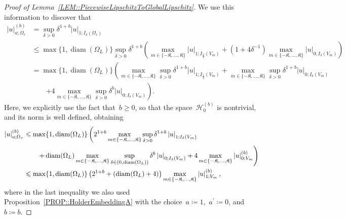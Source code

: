 \documentclass[12pt,a4paper]{amsart}
\makeatletter
\numberwithin{equation}{section}
\theoremstyle{definition}
\theoremstyle{remark}
\newcommand{\abs}[1]{\left\lvert#1\right\rvert}
\renewcommand{\leq}{\leqslant}
\renewcommand{\geq}{\geqslant}
\newcommand{\constapp}[1]{%
  \csname constapp@#1\endcsname%
}
\makeatother
\begin{document}
\begin{appendix}
\begin{proof}[Proof of Lemma~\ref{LEM::PiecewiseLipschitzToGlobalLipschitz}]
    We use this information to discover that
    \begin{equation}\label{EQ::LongComputationBis}
        \begin{split}
            \abs{u}_{a; \Omega_\tau}^{(b)} &= \sup_{\delta > 0}\delta^{1+b} \abs{u}_{1; I_\delta(\Omega_\tau)}\\
                &\leq \max\{1,\operatorname{diam}(\Omega_L)\} \sup_{\delta > 0}\delta^{1+b}\left(\max_{m \in \{-\mathfrak{K},\dots,\mathfrak{K}\}} \abs{u}_{1; I_{\frac{\delta}{2}}(V_m)} + (1+4{\delta^{-1}})\max_{m \in \{-\mathfrak{K},\dots,\mathfrak{K}\}}\abs{u}_{0;I_\delta(V_m)}\right)\\
                &= \max\{1,\operatorname{diam}(\Omega_L)\} \left(\max_{m \in \{-\mathfrak{K},\dots,\mathfrak{K}\}}\sup_{\delta > 0}\delta^{1+b}\abs{u}_{1; I_{\frac{\delta}{2}}(V_m)} +\max_{m \in \{-\mathfrak{K},\dots,\mathfrak{K}\}} \sup_{\delta > 0}\delta^{1+b}\abs{u}_{0;I_\delta(V_m)}\right.\\
                &\qquad \left.+ 4\max_{m \in \{-\mathfrak{K},\dots,\mathfrak{K}\}} \sup_{\delta > 0}\delta^{b}\abs{u}_{0;I_\delta(V_m)}\right).
        \end{split}
    \end{equation}
    Here, we explicitly use the fact that~$b \geq 0$, so that the space~$\mathcal{H}_0^{(b)}$ is nontrivial, and its norm is well defined, obtaining
    \begin{equation}\label{EQ::PiecewiseRegularityToGlobalLongComputationLipschitz}
        \begin{split}
                \abs{u}_{a; \Omega_\tau}^{(b)}&\leq \max\{1,\operatorname{diam}(\Omega_L)\} \left(2^{1+b}\max_{m \in \{-\mathfrak{K},\dots,\mathfrak{K}\}}\sup_{\delta > 0}\delta^{1+b}\abs{u}_{1; I_\delta(V_m)}\right.\\
                &\qquad \left.+ \operatorname{diam}(\Omega_L)\max_{m \in \{-\mathfrak{K},\dots,\mathfrak{K}\}} \sup_{\delta \in (0,\operatorname{diam}(\Omega_L))}\delta^{b}\abs{u}_{0;I_\delta(V_m)}+4\max_{m \in \{-\mathfrak{K},\dots,\mathfrak{K}\}} \abs{u}_{0;V_m}^{(b)}\right)\\
                &\leq \max\{1,\operatorname{diam}(\Omega_L)\} \left(2^{1+b} + \constapp{CONST::HolderEmbeddingA}\left(\operatorname{diam}(\Omega_L) + 4\right)\right)\max_{m \in \{-\mathfrak{K},\dots,\mathfrak{K}\}} \abs{u}_{1;V_m}^{(b)},
        \end{split}
    \end{equation}
    where in the last inequality we also used Proposition~\ref{PROP::HolderEmbeddingA} with the choice~$a \coloneq 1$,~$a^\prime \coloneq 0$, and~$b \coloneq b$.


\end{proof}
\end{appendix}
\end{document}
